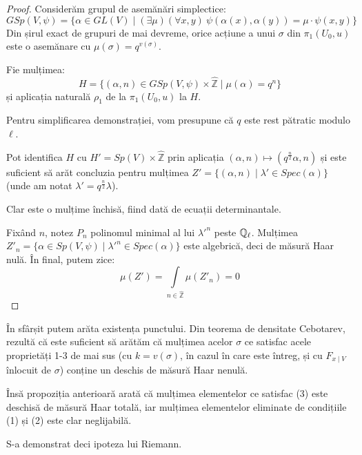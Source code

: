 \documentclass[13pt,openany]{book}
\begin{document}
\begin{proof}
Considerăm grupul de asemănări simplectice:
$$GSp(V,\psi)=\{\alpha\in GL(V) \mid (\exists \mu)(\forall x,y)\  \psi(\alpha(x),\alpha(y))=\mu\cdot\psi(x,y)\}$$
Din șirul exact de grupuri de mai devreme, orice acțiune a unui $\sigma$ din $\pi_1(U_0,u)$ este o asemănare cu $\mu(\sigma)=q^{v(\sigma)}$.

Fie mulțimea:
$$H=\{(\alpha,n)\in GSp(V,\psi) \times \hat{\mathbb{Z}} \mid \mu(\alpha)=q^n\}$$
și aplicația naturală $\rho_1$ de la $\pi_1(U_0,u)$ la $H$.

Pentru simplificarea demonstrației, vom presupune că $q$ este rest pătratic modulo $\ell$.

Pot identifica $H$ cu $H'=Sp(V) \times \hat{\mathbb{Z}}$ prin aplicația $(\alpha,n)\mapsto(q^{\frac{n}{2}}\alpha,n)$ și este suficient să arăt concluzia pentru mulțimea $Z'=\{(\alpha,n)\mid\lambda'\in Spec(\alpha)\}$ (unde am notat $\lambda'=q^{\frac{n}{2}}\lambda$).

Clar este o mulțime închisă, fiind dată de ecuații determinantale.

Fixând $n$, notez $P_n$ polinomul minimal al lui $\lambda'^n$ peste $\mathbb{Q}_\ell$. Mulțimea $Z'_n=\{\alpha\in Sp(V,\psi)\mid \lambda'^n \in Spec(\alpha)\}$ este algebrică, deci de măsură Haar nulă. În final, putem zice:
$$\mu(Z')=\int\limits_{n \in \hat{\mathbb{Z}}} \mu(Z'_n) = 0$$
\end{proof}

În sfârșit putem arăta existența punctului. Din teorema de densitate Cebotarev, rezultă că este suficient să arătăm că mulțimea acelor $\sigma$ ce satisfac acele proprietăți 1-3 de mai sus (cu $k=v(\sigma)$, în cazul în care este întreg, și cu $F_{x\mid V}$ înlocuit de $\sigma$) conține un deschis de măsură Haar nenulă.

Însă propoziția anterioară arată că mulțimea elementelor ce satisfac (3) este deschisă de măsură Haar totală, iar mulțimea elementelor eliminate de condițiile (1) și (2) este clar neglijabilă.

S-a demonstrat deci ipoteza lui Riemann.






















\end{document}
